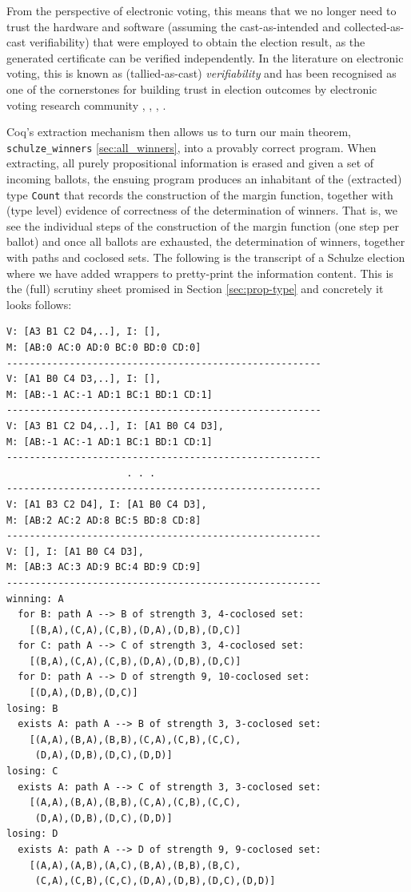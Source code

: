 From the perspective of electronic voting, this means that
we no longer need to trust the hardware and software (assuming the 
cast-as-intended and collected-as-cast verifiability)
that were employed to obtain the election result, as the generated
certificate can be verified independently. In the literature on
electronic voting, this is known as (tallied-as-cast) \emph{verifiability} and has
been recognised as one of the cornerstones for building trust in
election outcomes by electronic voting research community \citep{Chaum:2004:SBR}
 \citep{5958051}, \citep{Benaloh:1994:RSE:195058.195407},  
 \citep{Delaune:2010:VPT}, \citep{Bernhard:2017:PES}.
 
  


Coq's extraction mechanism then allows us to turn our main theorem, 
\texttt{schulze\_winners} \ref{sec:all_winners},  into a
provably correct program. 
When extracting, all purely propositional
information is erased and given a set of incoming ballots, the ensuing program produces an inhabitant
of the (extracted) type \texttt{Count} that records the construction
of the margin function, together with (type level) evidence of
correctness of the determination of winners. That is, we see the
individual steps of the construction of the margin function (one
step per
ballot) and once all ballots are exhausted, the determination of
winners, together with paths and coclosed sets. The following is
the transcript of a Schulze election where we have added wrappers
to pretty-print the information content. This is the (full) scrutiny
sheet promised in Section \ref{sec:prop-type} and concretely 
it looks follows:
%
\begin{verbatim}
V: [A3 B1 C2 D4,..], I: [],
M: [AB:0 AC:0 AD:0 BC:0 BD:0 CD:0]
-------------------------------------------------------
V: [A1 B0 C4 D3,..], I: [],
M: [AB:-1 AC:-1 AD:1 BC:1 BD:1 CD:1]
-------------------------------------------------------
V: [A3 B1 C2 D4,..], I: [A1 B0 C4 D3],
M: [AB:-1 AC:-1 AD:1 BC:1 BD:1 CD:1]
-------------------------------------------------------
                     . . .
-------------------------------------------------------
V: [A1 B3 C2 D4], I: [A1 B0 C4 D3],
M: [AB:2 AC:2 AD:8 BC:5 BD:8 CD:8]
-------------------------------------------------------
V: [], I: [A1 B0 C4 D3],
M: [AB:3 AC:3 AD:9 BC:4 BD:9 CD:9]
-------------------------------------------------------
winning: A
  for B: path A --> B of strength 3, 4-coclosed set: 
    [(B,A),(C,A),(C,B),(D,A),(D,B),(D,C)]
  for C: path A --> C of strength 3, 4-coclosed set:
    [(B,A),(C,A),(C,B),(D,A),(D,B),(D,C)]
  for D: path A --> D of strength 9, 10-coclosed set:
    [(D,A),(D,B),(D,C)]
losing: B
  exists A: path A --> B of strength 3, 3-coclosed set:
    [(A,A),(B,A),(B,B),(C,A),(C,B),(C,C),
     (D,A),(D,B),(D,C),(D,D)]
losing: C
  exists A: path A --> C of strength 3, 3-coclosed set:
    [(A,A),(B,A),(B,B),(C,A),(C,B),(C,C),
     (D,A),(D,B),(D,C),(D,D)]
losing: D
  exists A: path A --> D of strength 9, 9-coclosed set:
    [(A,A),(A,B),(A,C),(B,A),(B,B),(B,C),
     (C,A),(C,B),(C,C),(D,A),(D,B),(D,C),(D,D)]  
\end{verbatim}
